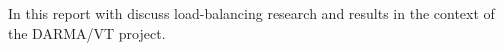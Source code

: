 In this report with discuss load-balancing research and results in the
context of the DARMA/VT project.